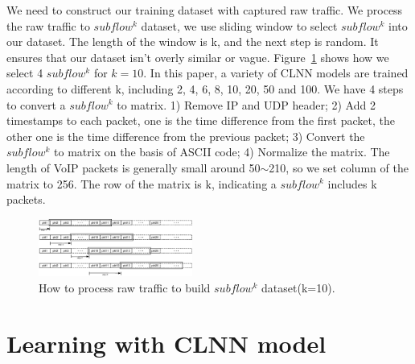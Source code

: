 \documentclass[conference]{IEEEtran}
\begin{document}
We need to construct our training dataset with captured raw traffic. We process the raw traffic to $subflow^k$ dataset, we use sliding window to select $subflow^k$ into our dataset. The length of the window is k, and the next step is random. It ensures that our dataset isn't overly similar or vague. Figure~\ref{fig:dataset} shows how we select 4 $subflow^k$ for $k=10$. In this paper, a variety of CLNN models are trained according to different k, including 2, 4, 6, 8, 10, 20, 50 and 100. We have 4 steps to convert a $subflow^k$ to matrix. 1) Remove IP and UDP header; 2) Add 2 timestamps to each packet, one is the time difference from the first packet, the other one is the time difference from the previous packet; 3) Convert the $subflow^k$ to matrix on the basis of ASCII code; 4) Normalize the matrix. The length of VoIP packets is generally small around 50$\sim$210, so we set column of the matrix to 256. The row of the matrix is k, indicating a $subflow^k$ includes k packets.

\begin{figure}[htp]
\begin{center}
\includegraphics[width=0.45\textwidth]{dataset.eps}
\caption{How to process raw traffic to build $subflow^k$ dataset(k=10).}\label{fig:dataset}
\end{center}
\end{figure}

\section{Learning with CLNN model}
\label{sec:learningusingdeeplearningmodel}
\end{document}
